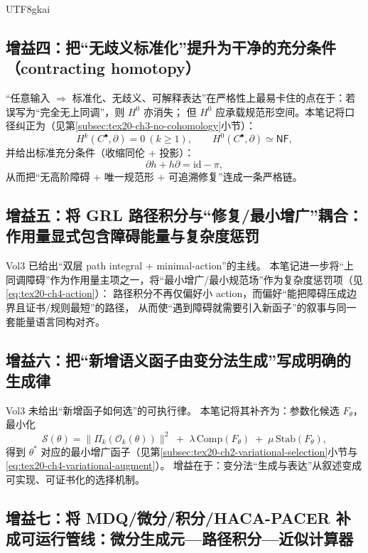 \documentclass[12pt]{article}
\begin{document}
\begin{CJK*}{UTF8}{gkai}
\subsection{增益四：把“无歧义标准化”提升为干净的充分条件（contracting homotopy）}
\label{subsec:tex20-ch5-gain4}

“任意输入 $\Rightarrow$ 标准化、无歧义、可解释表达”在严格性上最易卡住的点在于：若误写为“完全无上同调”，则 $H^0$ 亦消失；
但 $H^0$ 应承载规范形空间。本笔记将口径纠正为（见第\ref{subsec:tex20-ch3-no-cohomology}小节）：
\[
H^{k}(C^\bullet,\partial)=0\ (k\ge 1),
\qquad
H^0(C^\bullet,\partial)\simeq \mathsf{NF},
\]
并给出标准充分条件（收缩同伦 + 投影）：
\[
\partial h+h\partial=\mathrm{id}-\pi,
\]
从而把“无高阶障碍 + 唯一规范形 + 可追溯修复”连成一条严格链。\cite{AxiomSemanticsWorkflowTex18}

\subsection{增益五：将 \textsf{GRL} 路径积分与“修复/最小增广”耦合：作用量显式包含障碍能量与复杂度惩罚}
\label{subsec:tex20-ch5-gain5}

Vol3 已给出“双层 path integral + minimal-action”的主线。\cite{GaoZhengAppVol3}
本笔记进一步将“上同调障碍”作为作用量主项之一，将“最小增广/最小规范场”作为复杂度惩罚项（见 \eqref{eq:tex20-ch4-action}）：
路径积分不再仅偏好小 action，而偏好“能把障碍压成边界且证书/规则最短”的路径，
从而使“遇到障碍就需要引入新函子”的叙事与同一套能量语言同构对齐。

\subsection{增益六：把“新增语义函子由变分法生成”写成明确的生成律}
\label{subsec:tex20-ch5-gain6}

Vol3 未给出“新增函子如何选”的可执行律。\cite{GaoZhengAppVol3}
本笔记将其补齐为：参数化候选 $F_\theta$，最小化
\[
\mathcal{S}(\theta)=\bigl\|\Pi_k(\mathcal{O}_k(\theta))\bigr\|^2
\;+\;
\lambda\,\mathrm{Comp}(F_\theta)
\;+\;
\mu\,\mathrm{Stab}(F_\theta),
\]
得到 $\theta^\ast$ 对应的最小增广函子（见第\ref{subsec:tex20-ch2-variational-selection}小节与 \eqref{eq:tex20-ch4-variational-augment}）。
  \cite{BV1981}
增益在于：变分法“生成与表达”从叙述变成可实现、可证书化的选择机制。

\subsection{增益七：将 \textsf{MDQ}/微分/积分/\textsf{HACA}-\textsf{PACER} 补成可运行管线：微分生成元—路径积分—近似计算器}
\label{subsec:tex20-ch5-gain7}


\end{CJK*}
\end{document}
